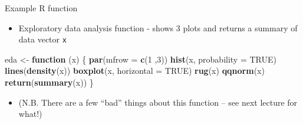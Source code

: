 \documentclass[ignorenonframetext,]{beamer}
\newenvironment{Shaded}{\begin{snugshade}}{\end{snugshade}}
\newcommand{\KeywordTok}[1]{\textcolor[rgb]{0.13,0.29,0.53}{\textbf{#1}}}
\newcommand{\DataTypeTok}[1]{\textcolor[rgb]{0.13,0.29,0.53}{#1}}
\newcommand{\DecValTok}[1]{\textcolor[rgb]{0.00,0.00,0.81}{#1}}
\newcommand{\StringTok}[1]{\textcolor[rgb]{0.31,0.60,0.02}{#1}}
\newcommand{\OtherTok}[1]{\textcolor[rgb]{0.56,0.35,0.01}{#1}}
\newcommand{\ControlFlowTok}[1]{\textcolor[rgb]{0.13,0.29,0.53}{\textbf{#1}}}
\newcommand{\NormalTok}[1]{#1}
\providecommand{\tightlist}{%
  \setlength{\itemsep}{0pt}\setlength{\parskip}{0pt}}
\begin{document}
\begin{frame}[fragile]{Example R function}

\begin{itemize}[<+->]
\tightlist
\item
  Exploratory data analysis function - shows 3 plots and returns a
  summary of data vector \texttt{x}
\end{itemize}

\begin{Shaded}
\begin{Highlighting}[]
\NormalTok{eda <-}\StringTok{ }\ControlFlowTok{function}\NormalTok{ (x) \{}
  \KeywordTok{par}\NormalTok{(}\DataTypeTok{mfrow =} \KeywordTok{c}\NormalTok{(}\DecValTok{1}\NormalTok{ ,}\DecValTok{3}\NormalTok{))}
  \KeywordTok{hist}\NormalTok{(x, }\DataTypeTok{probability =} \OtherTok{TRUE}\NormalTok{)}
  \KeywordTok{lines}\NormalTok{(}\KeywordTok{density}\NormalTok{(x))}
  \KeywordTok{boxplot}\NormalTok{(x, }\DataTypeTok{horizontal =} \OtherTok{TRUE}\NormalTok{)}
  \KeywordTok{rug}\NormalTok{(x)}
  \KeywordTok{qqnorm}\NormalTok{(x)}
  \KeywordTok{return}\NormalTok{(}\KeywordTok{summary}\NormalTok{(x))}
\NormalTok{\}}
\end{Highlighting}
\end{Shaded}

\begin{itemize}[<+->]
\tightlist
\item
  (N.B. There are a few ``bad'' things about this function -- see next
  lecture for what!)
\end{itemize}

\end{frame}
\end{document}
